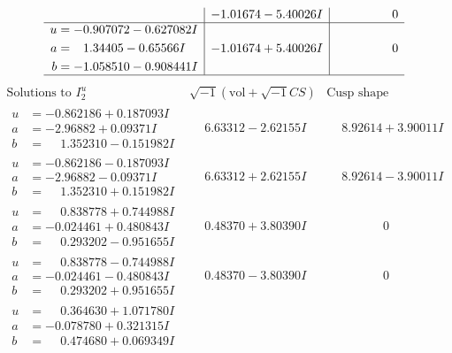 \documentclass[1p]{elsarticle_modified}
\theoremstyle{definition}
\newcommand{\I}{\sqrt{-1}}
\begin{document}
$$\begin{array}{c|c|c}
 & -1.01674 - 5.40026 I & \phantom{-0.000000 } 0 \\ \hline\begin{aligned}
u &= -0.907072 - 0.627082 I \\
a &= \phantom{-}1.34405 - 0.65566 I \\
b &= -1.058510 - 0.908441 I\end{aligned}
 & -1.01674 + 5.40026 I & \phantom{-0.000000 } 0\\
 \hline 
 \end{array}$$\newpage$$\begin{array}{c|c|c}  
\text{Solutions to }I^u_{2}& \I (\text{vol} + \sqrt{-1}CS) & \text{Cusp shape}\\
 \hline 
\begin{aligned}
u &= -0.862186 + 0.187093 I \\
a &= -2.96882 + 0.09371 I \\
b &= \phantom{-}1.352310 - 0.151982 I\end{aligned}
 & \phantom{-}6.63312 - 2.62155 I & \phantom{-}8.92614 + 3.90011 I \\ \hline\begin{aligned}
u &= -0.862186 - 0.187093 I \\
a &= -2.96882 - 0.09371 I \\
b &= \phantom{-}1.352310 + 0.151982 I\end{aligned}
 & \phantom{-}6.63312 + 2.62155 I & \phantom{-}8.92614 - 3.90011 I \\ \hline\begin{aligned}
u &= \phantom{-}0.838778 + 0.744988 I \\
a &= -0.024461 + 0.480843 I \\
b &= \phantom{-}0.293202 - 0.951655 I\end{aligned}
 & \phantom{-}0.48370 + 3.80390 I & \phantom{-0.000000 } 0 \\ \hline\begin{aligned}
u &= \phantom{-}0.838778 - 0.744988 I \\
a &= -0.024461 - 0.480843 I \\
b &= \phantom{-}0.293202 + 0.951655 I\end{aligned}
 & \phantom{-}0.48370 - 3.80390 I & \phantom{-0.000000 } 0 \\ \hline\begin{aligned}
u &= \phantom{-}0.364630 + 1.071780 I \\
a &= -0.078780 + 0.321315 I \\
b &= \phantom{-}0.474680 + 0.069349 I\end{aligned}

\end{array}$$
\end{document}
